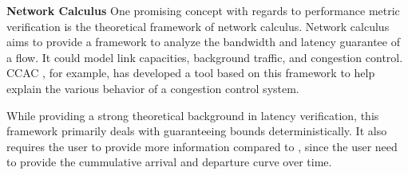 
\textbf{Network Calculus}
One promising concept with regards to performance metric verification is the theoretical 
framework of network calculus.
Network calculus aims to provide a framework to analyze the bandwidth and latency guarantee 
of a flow.
It could model link capacities, background traffic, and congestion control.
CCAC \cite{ccac}, for example, has developed a tool based on this framework to help explain 
the various behavior of a congestion control system.

While providing a strong theoretical background in latency verification, this framework 
primarily deals with guaranteeing bounds deterministically.
It also requires the user to provide more information compared to \tool, since the user 
need to provide the cummulative arrival and departure curve over time.

